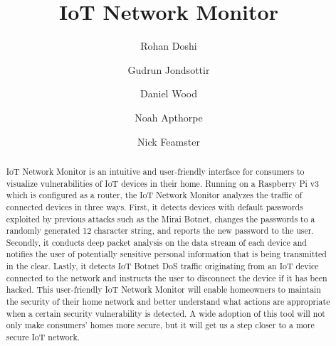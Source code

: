 \documentclass[sigconf]{acmart}
\begin{document}
\title{IoT Network Monitor} 
\author{Rohan Doshi}
\author{Gudrun Jondsottir}
\author{Daniel Wood}
\author{Noah Apthorpe}
\author{Nick Feamster}

\begin{abstract}
IoT Network Monitor is an intuitive and user-friendly interface for consumers to visualize vulnerabilities of IoT devices in their home. Running on a Raspberry Pi v3 which is configured as a router, the IoT Network Monitor analyzes the traffic of connected devices in three ways. First, it detects devices with default passwords exploited by previous attacks such as the Mirai Botnet, changes the passwords to a randomly generated 12 character string, and reports the new password to the user. Secondly, it conducts deep packet analysis on the data stream of each device and notifies the user of potentially sensitive personal information that is being transmitted in the clear. Lastly, it detects IoT Botnet DoS traffic originating from an IoT device connected to the network and instructs the user to disconnect the device if it has been hacked. This user-friendly IoT Network Monitor will enable homeowners to maintain the security of their home network and better understand what actions are appropriate when a certain security vulnerability is detected. A wide adoption of this tool will not only make consumers' homes more secure, but it will get us a step closer to a more secure IoT network.
\end{abstract}


\maketitle




\end{document}
